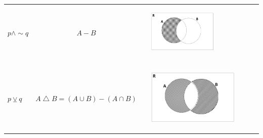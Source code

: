 \documentclass[12pt]{article}
\theoremstyle{definition}
\theoremstyle{remark}
\begin{document}
\begin{enumerate}
\begin{table}[ H]
\begin{center}
\begin{tabular} { l c c l }
$ p \wedge \sim q $ &$A-B$ & & \begin{minipage}{5cm} \begin{center} 
\includegraphics[width=0.6\textwidth]{TP1Fig7.jpg} 
\end{center}
\end{minipage}\\ \\   
$p \veebar q$ &$A \bigtriangleup B = (A \cup B ) - (A \cap B)$ & & \begin{minipage}{5cm} \begin{center} 
\includegraphics[width=0.8\textwidth]{TP1Fig8.jpg} 
\end{center}
\end{minipage}
\end{tabular} 
\end{center} 
\end{table}



\end{enumerate}
\end{document}
